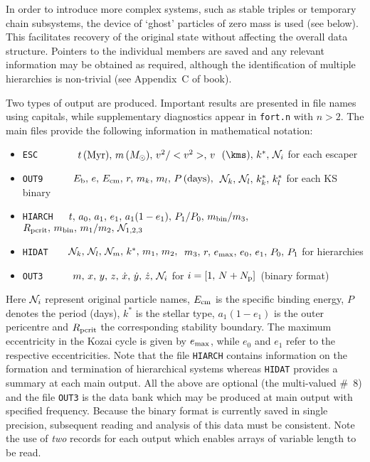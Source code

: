 \documentclass[12pt]{article}
\begin{document}
In order to introduce more complex systems, such as stable triples or
temporary chain subsystems, the device of `ghost' particles of zero mass is
used (see below).
This facilitates recovery of the original state without affecting the overall
data structure.
Pointers to the individual members are saved and any relevant information may
be obtained as required, although the identification of multiple hierarchies
is non-trivial (see Appendix~C of book).

Two types of output are produced.
Important results are presented in file names using capitals, while
supplementary diagnostics appear in {\tt fort.n} with $n > 2$.
The main files provide the following information in mathematical notation:

\begin{itemize}
\item {\tt ESC}~~~~~~~~$t\,({\rm Myr}),\, m \,(M_{\odot}) ,\, v^2/<v^2>,\, v\,$
$(\kms),\, k^{\ast},\,{\cal N}_i$ for each escaper
\item {\tt OUT9}~~~~~~$E_{\rm b},\, e,\, E_{\rm cm},\, r,\, m_k,\, m_l,\, P \,({\rm days}),$
$\,{\cal N}_k,\, {\cal N}_l,\, k_k^{\ast},\,k_l^{\ast}$ for each KS binary
\item {\tt HIARCH}~~~$t,\,a_0,\,a_1,\,e_1,\,a_1(1-e_1),\,P_1/P_0,\,m_{\rm bin}/m_3,\,$
$R_{\rm pcrit}, \,m_{\rm bin},\,m_1/m_2,\,{\cal N}_{1,2,3}$
\item {\tt HIDAT}~~~~${\cal N}_k,\,{\cal N}_l,\,{\cal N}_m,\,k^{\ast},\,m_1,\,m_2,$
$\,m_3,\,r,\,e_{\rm max},\,e_0,\,e_1,\,P_0,\,P_1$ for hierarchies
\item {\tt OUT3}~~~~~~$m,\,x,\,y,\,z,\,{\dot x},\,{\dot y},\,{\dot z},\,{\cal N}_i$
for $i = [1,\,N + N_{\rm p}]$\, (binary format)
\end{itemize}

Here ${\cal N}_i$ represent original particle names, $E_{\rm cm}$ is the
specific \cm binding energy, $P$ denotes the period (days), $k^{\ast}$ is the
stellar type, $a_1 (1 - e_1)$ is the outer pericentre and $R_{\rm pcrit}$
the corresponding stability boundary.
The maximum eccentricity in the Kozai cycle is given by $e_{\rm max}$, while
$e_0$ and $e_1$ refer to the respective eccentricities.
Note that the file {\tt HIARCH} contains information on the formation and
termination of hierarchical systems whereas {\tt HIDAT} provides a summary
at each main output.
All the above are optional (\cf the multi-valued \#~8) and the file
{\tt OUT3} is the data bank which may be produced at main output with
specified frequency.
Because the binary format is currently saved in single precision, subsequent
reading and analysis of this data must be consistent.
Note the use of {\it two} records for each output which enables arrays of
variable length to be read.
\end{document}
